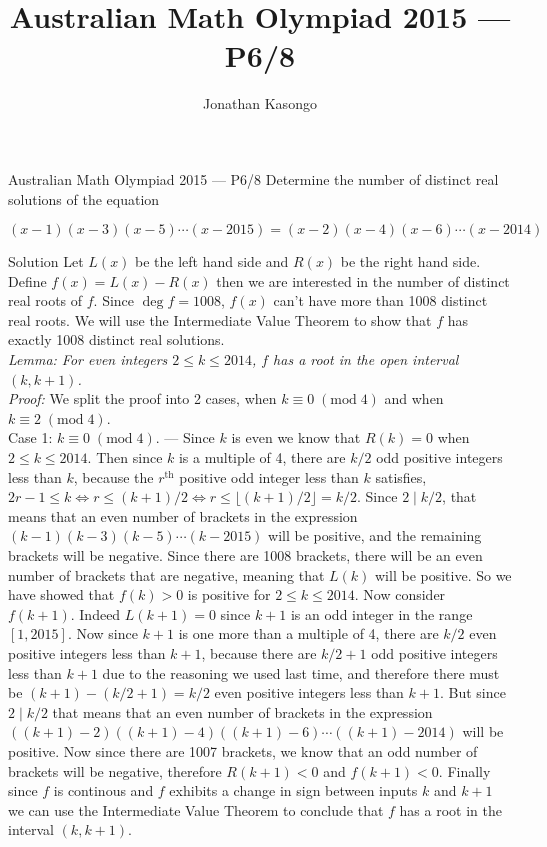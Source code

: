 \documentclass{article}
\author{Jonathan Kasongo}
\title{Australian Math Olympiad 2015 --- P6/8}
\begin{document}
\maketitle

\begin{problem}{Australian Math Olympiad 2015 --- P6/8}
Determine the number of distinct real solutions of the equation \vspace{0.2cm}

$(x-1)(x-3)(x-5) \cdots (x-2015) =
 (x-2)(x-4)(x-6) \cdots (x-2014)$
\end{problem}
\begin{solution}{Solution}
Let $L(x)$ be the left hand side and $R(x)$ be the right hand side.
Define $f(x) = L(x) - R(x)$
then we are interested in the number of distinct real roots of $f$.
Since $\deg f = 1008$, $f(x)$ can't have more than 1008 distinct real
roots. We will use the Intermediate Value Theorem to show that $f$ has
exactly 1008 distinct real solutions.\\

\textit{Lemma: For even integers $2 \leq k \leq 2014$, $f$ has a root in
the open interval $(k, k + 1)$.}\\

\textit{Proof:} We split the proof into 2 cases, when
$k \equiv 0 \; (\text{mod} \; 4)$ and when
$k \equiv 2 \; (\text{mod} \; 4)$.\\

Case 1: $k \equiv 0 \; (\text{mod} \; 4)$. --- Since $k$ is even we know
that $R(k) = 0$ when $2\leq k \leq 2014$. Then since $k$ is a multiple of
4, there are $k/2$ odd positive integers less than $k$, because the
$r^{\text{th}}$ positive odd integer less than $k$ satisfies,
$2r - 1 \leq k \iff r \leq (k+1)/2 \iff r \leq \lfloor (k+1)/2 \rfloor = k/2$.
Since $2 \mid k/2$, that means that an even number of brackets in the expression
$(k-1)(k-3)(k-5) \cdots (k-2015)$ will be positive, and the remaining
brackets will be negative. Since there are 1008 brackets, there will be an
even number of brackets that are negative, meaning that $L(k)$ will be
positive. So we have showed that $f(k) > 0$ is positive for
$2 \leq k \leq 2014$. Now consider $f(k+1)$. Indeed $L(k+1) = 0$
since $k+1$ is an odd integer in the range $[1, 2015]$. Now since $k+1$ is
one more than a multiple of 4, there are $k/2$ even positive integers
less than $k+1$, because there are $k/2 + 1$ odd positive integers less
than $k+1$ due to the reasoning we used last time, and therefore there must
be $(k+1) - (k/2 + 1) = k/2$ even positive integers less than $k+1$. But
since $2 \mid k/2$ that means that an even number of brackets in the
expression $((k+1)-2)((k+1)-4)((k+1)-6) \cdots ((k+1)-2014)$ will be positive. Now since
there are 1007 brackets, we know that an odd number of brackets will be
negative, therefore $R(k+1) < 0$ and $f(k+1) < 0$. Finally since $f$ is
continous and $f$ exhibits a change in sign between inputs $k$ and $k + 1$
we can use the Intermediate Value Theorem to conclude that $f$ has a root
in the interval $(k, k+1)$.\\


\end{solution}
\end{document}
